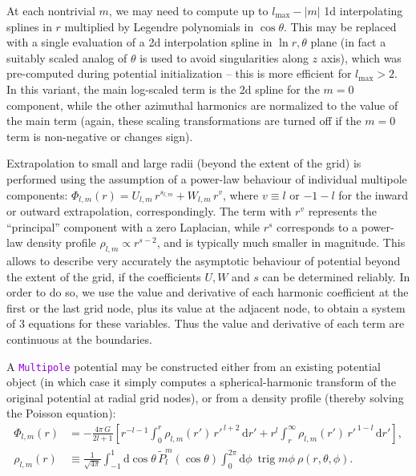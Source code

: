 \documentclass[12pt]{article}
\newcommand{\ttt}[1]{\textcolor{darkviolet}{\texttt{#1}}}
\renewcommand{\d}{\mathrm{d}}
\DeclareMathOperator{\trig}{trig}
\begin{document}
At each nontrivial $m$, we may need to compute up to $l_\mathrm{max}-|m|$ 1d interpolating splines in $r$ multiplied by Legendre polynomials in $\cos\theta$. This may be replaced with a single evaluation of a 2d interpolation spline in $\ln r,\theta$ plane (in fact a suitably scaled analog of $\theta$ is used to avoid singularities along $z$ axis), which was pre-computed during potential initialization -- this is more efficient for $l_\mathrm{max}>2$. In this variant, the main log-scaled term is the 2d spline for the $m=0$ component, while the other azimuthal harmonics are normalized to the value of the main term (again, these scaling transformations are turned off if the $m=0$ term is non-negative or changes sign).

Extrapolation to small and large radii (beyond the extent of the grid) is performed using the assumption of a power-law behaviour of individual multipole components: $\Phi_{l,m}(r) = U_{l,m}\, r^{s_{l,m}} + W_{l,m}\, r^{v}$, where $v\equiv l$ or $-1-l$ for the inward or outward extrapolation, correspondingly. The term with $r^v$ represents the ``principal'' component with a zero Laplacian, while $r^s$ corresponds to a power-law density profile $\rho_{l,m}\propto r^{s-2}$, and is typically much smaller in magnitude. This allows to describe very accurately the asymptotic behaviour of potential beyond the extent of the grid, if the coefficients $U,W$ and $s$ can be determined reliably. In order to do so, we use the value and derivative of each harmonic coefficient at the first or the last grid node, plus its value at the adjacent node, to obtain a system of 3 equations for these variables. Thus the value and derivative of each term are continuous at the boundaries. 

A \ttt{Multipole} potential may be constructed either from an existing potential object (in which case it simply computes a spherical-harmonic transform of the original potential at radial grid nodes), or from a density profile (thereby solving the Poisson equation):
\begin{align}
\Phi_{l,m}(r) &= -\frac{4\pi\,G}{2l+1} \left[ r^{-l-1} \int_0^r \rho_{l,m}(r')\,{r'}^{\,l+2}\,\d r' + r^l\int_r^\infty \rho_{l,m}(r')\,{r'}^{\,1-l}\,\d r' \right],  \label{eq:SphHarmPoisson} \\
\rho_{l,m}(r) &\equiv \frac{1}{\sqrt{4\pi}} \int_{-1}^1 \d \cos\theta\, \tilde P_l^m(\cos\theta) \int_0^{2\pi}\d \phi\:\trig m\phi\:\rho(r,\theta,\phi) .  \label{eq:SphHarmDensity}
\end{align}
\end{document}
